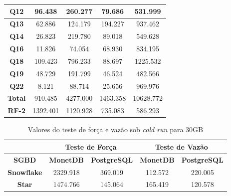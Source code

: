 \begin{table}[t]
\begin{tabular}{|c|c|c|c|c|}
                 \textbf{Q12}         & 96.438            & 260.277                       & 79.686            & 531.999                   \\ 
                \hline
                 \textbf{Q13}         & 62.886            & 124.179                       & 194.227           & 937.462                   \\ 
                \hline
                 \textbf{Q14}         & 26.823            & 219.780                       & 89.018            & 549.628                   \\ 
                \hline
                 \textbf{Q16}         & 11.826            & 74.054                        & 68.930            & 834.195                   \\ 
                \hline
                 \textbf{Q18}         & 109.423           & 796.233                       & 88.697            & 1225.532                  \\ 
                \hline
                 \textbf{Q19}         & 48.729            & 191.799                       & 46.524            & 482.566                   \\ 
                \hline
                 \textbf{Q22}         & 8.121             & 88.714                        & 25.656            & 969.976                   \\ 
                \hline
                 \textbf{Total}       & 910.485           & 4277.000                      & 1463.358          & 10628.772                 \\ 
                \hline
                 \textbf{RF-2}        & 1392.401          & 1120.928                      & 735.083           & 586.293                   \\
                \hline
                \end{tabular}
                \end{table}

\begin{table}[htpb]
        \centering
        \caption{Valores do teste de força e vazão sob \textit{cold run} para 30GB}
        \label{tab:forca_vazao_cold_30}
        \begin{tabular}{|c|c|c|c|c|} 
                \cline{2-5}
                \multicolumn{1}{c|}{} & \multicolumn{2}{c|}{\textbf{Teste de Força} } & \multicolumn{2}{c|}{\textbf{Teste de Vazão} }  \\ 
                \hline
                 \textbf{SGBD}        & \textbf{MonetDB}  & \textbf{PostgreSQL}       & \textbf{MonetDB}  & \textbf{PostgreSQL}        \\ 
                \hline
                 \textbf{Snowflake}   & 2329.918          & 369.019                   & 112.572           & 220.005                    \\ 
                \hline
                 \textbf{Star}        & 1474.766          & 145.064                   & 165.419           & 120.578                    \\
                \hline
                \end{tabular}
                \end{table}

